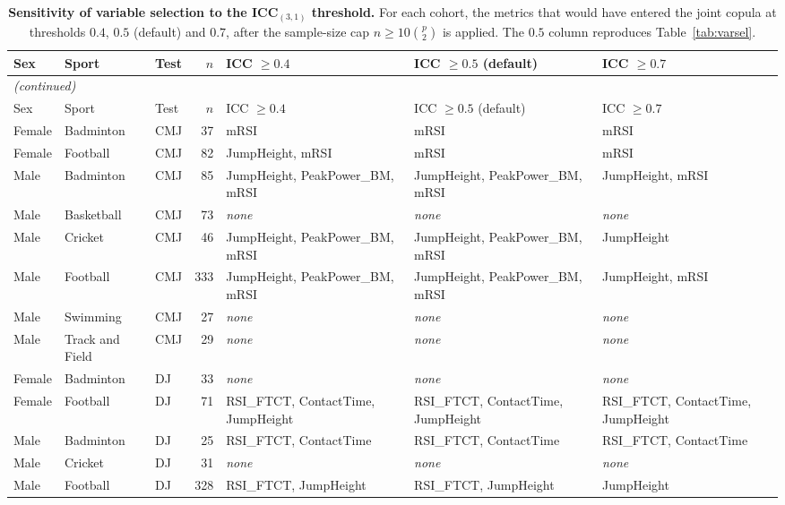 {\footnotesize
\begin{longtable}{lllrp{3.2cm}p{3.2cm}p{3.2cm}}
\caption{\textbf{Sensitivity of variable selection to the ICC$_{(3,1)}$ threshold.} For each cohort, the metrics that would have entered the joint copula at thresholds $0.4$, $0.5$ (default) and $0.7$, after the sample-size cap $n\!\geq\!10\binom{p}{2}$ is applied. The $0.5$ column reproduces Table~\ref{tab:varsel}.}\label{tab:varsel_sensitivity}\\
\toprule
Sex & Sport & Test & $n$ & ICC $\geq 0.4$ & ICC $\geq 0.5$ (default) & ICC $\geq 0.7$ \\
\midrule
\endfirsthead
\multicolumn{7}{l}{\emph{(continued)}} \\
\toprule
Sex & Sport & Test & $n$ & ICC $\geq 0.4$ & ICC $\geq 0.5$ (default) & ICC $\geq 0.7$ \\
\midrule
\endhead
\bottomrule
\endfoot
Female & Badminton & CMJ & 37 & mRSI & mRSI & mRSI \\
Female & Football & CMJ & 82 & JumpHeight, mRSI & mRSI & mRSI \\
Male & Badminton & CMJ & 85 & JumpHeight, PeakPower\_BM, mRSI & JumpHeight, PeakPower\_BM, mRSI & JumpHeight, mRSI \\
Male & Basketball & CMJ & 73 & \emph{none} & \emph{none} & \emph{none} \\
Male & Cricket & CMJ & 46 & JumpHeight, PeakPower\_BM, mRSI & JumpHeight, PeakPower\_BM, mRSI & JumpHeight \\
Male & Football & CMJ & 333 & JumpHeight, PeakPower\_BM, mRSI & JumpHeight, PeakPower\_BM, mRSI & JumpHeight, mRSI \\
Male & Swimming & CMJ & 27 & \emph{none} & \emph{none} & \emph{none} \\
Male & Track and Field & CMJ & 29 & \emph{none} & \emph{none} & \emph{none} \\
\addlinespace[1pt]
Female & Badminton & DJ & 33 & \emph{none} & \emph{none} & \emph{none} \\
Female & Football & DJ & 71 & RSI\_FTCT, ContactTime, JumpHeight & RSI\_FTCT, ContactTime, JumpHeight & RSI\_FTCT, ContactTime, JumpHeight \\
Male & Badminton & DJ & 25 & RSI\_FTCT, ContactTime & RSI\_FTCT, ContactTime & RSI\_FTCT, ContactTime \\
Male & Cricket & DJ & 31 & \emph{none} & \emph{none} & \emph{none} \\
Male & Football & DJ & 328 & RSI\_FTCT, JumpHeight & RSI\_FTCT, JumpHeight & JumpHeight \\

\end{longtable}}
